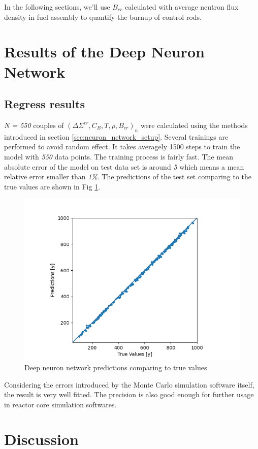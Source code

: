 In the following sections, we'll use $B_{cr}$ calculated with average neutron flux density
in fuel assembly to quantify the burnup of control rods.

\section{Results of the Deep Neuron Network}
\label{sec:dnn}

\subsection{Regress results}
\label{sec:regression_results}

\textit{N = 550} couples of $(\Delta \Sigma^{cr}, C_B, T, \rho, B_{cr})_n$ were calculated using the
methods introduced in section \ref{sec:neuron_network_setup}.
Several trainings are performed to avoid random effect.
It takes averagely 1500 steps to train the model with \textit{550} data points.
The training process is fairly fast.
The mean absolute error of the model on test data set is around \textit{5} which means a mean relative error smaller
than \textit{1\%}.
The predictions of the test set comparing to the true values are shown in Fig \ref{fig:result1}.

\begin{figure}[!htb]
    \centering\includegraphics[width=0.6\linewidth]{Figs/DNN_result.png}
    \caption{Deep neuron network predictions comparing to true values}
    \label{fig:result1}
\end{figure}

Considering the errors introduced by the Monte Carlo simulation software itself, the result is very well fitted.
The precision is also good enough for further usage in reactor core simulation softwares.


\section{Discussion}
\label{sec:discussion}

